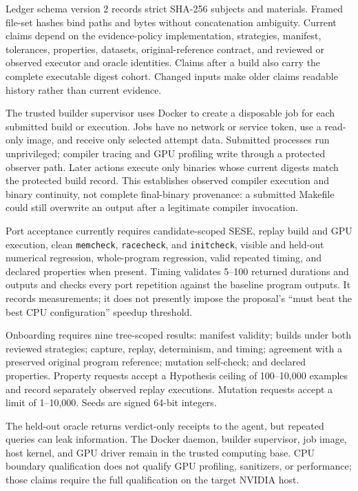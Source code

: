 \documentclass[11pt]{article}
\begin{document}
Ledger schema version 2 records strict SHA-256 subjects and materials. Framed
file-set hashes bind paths and bytes without concatenation ambiguity. Current
claims depend on the evidence-policy implementation, strategies, manifest,
tolerances, properties, datasets, original-reference contract, and reviewed or
observed executor and oracle identities. Claims after a build also carry the
complete executable digest cohort. Changed inputs make older claims readable
history rather than current evidence.

The trusted builder supervisor uses Docker to create a disposable job for each
submitted build or execution. Jobs have no network or service token, use a
read-only image, and receive only selected attempt data. Submitted processes run
unprivileged; compiler tracing and GPU profiling write through a protected
observer path. Later actions execute only binaries whose current digests match
the protected build record. This establishes observed compiler execution and
binary continuity, not complete final-binary provenance: a submitted Makefile
could still overwrite an output after a legitimate compiler invocation.

Port acceptance currently requires candidate-scoped SESE, replay build and GPU
execution, clean \texttt{memcheck}, \texttt{racecheck}, and \texttt{initcheck},
visible and held-out numerical regression, whole-program regression, valid
repeated timing, and declared properties when present. Timing validates 5--100
returned durations and outputs and checks every port repetition against the
baseline program outputs. It records measurements; it does not presently impose
the proposal's ``must beat the best CPU configuration'' speedup threshold.

Onboarding requires nine tree-scoped results: manifest validity; builds under
both reviewed strategies; capture, replay, determinism, and timing; agreement
with a preserved original program reference; mutation self-check; and declared
properties. Property requests accept a Hypothesis ceiling of 100--10{,}000
examples and record separately observed replay executions. Mutation requests
accept a limit of 1--10{,}000. Seeds are signed 64-bit integers.

The held-out oracle returns verdict-only receipts to the agent, but repeated
queries can leak information. The Docker daemon, builder supervisor, job image,
host kernel, and GPU driver remain in the trusted computing base. CPU boundary
qualification does not qualify GPU profiling, sanitizers, or performance; those
claims require the full qualification on the target NVIDIA host.
\end{document}
